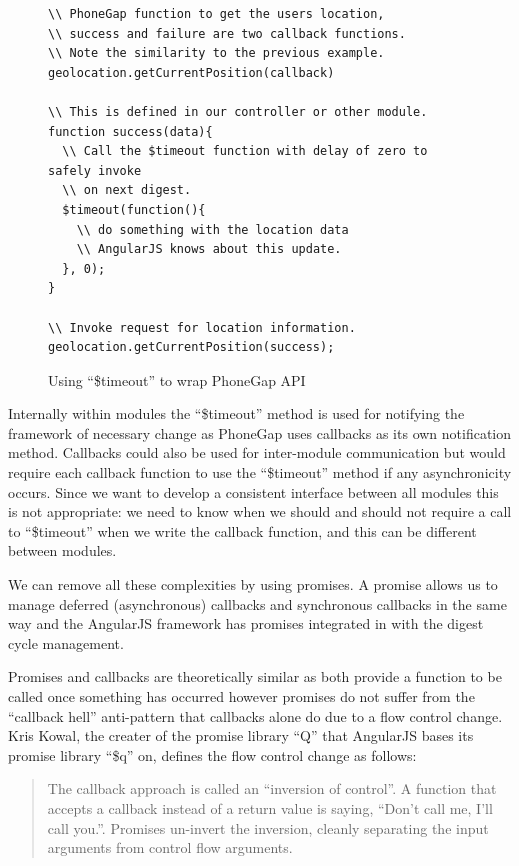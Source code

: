 \begin{figure}[h]
\begin{verbatim}
\\ PhoneGap function to get the users location,
\\ success and failure are two callback functions.
\\ Note the similarity to the previous example.
geolocation.getCurrentPosition(callback)

\\ This is defined in our controller or other module.
function success(data){
  \\ Call the $timeout function with delay of zero to safely invoke
  \\ on next digest.
  $timeout(function(){
    \\ do something with the location data
    \\ AngularJS knows about this update.
  }, 0);
}

\\ Invoke request for location information.
geolocation.getCurrentPosition(success);
\end{verbatim}
\caption{Using ``\$timeout'' to wrap PhoneGap API}
\label{fig:timeout}
\end{figure}

Internally within modules the ``\$timeout'' method is used for
notifying the framework of necessary change as PhoneGap uses callbacks
as its own notification method. Callbacks could also be used for
inter-module communication but would require each callback function to
use the ``\$timeout'' method if any asynchronicity occurs. Since we
want to develop a consistent interface between all modules this is not
appropriate: we need to know when we should and should not require a
call to ``\$timeout'' when we write the callback function, and this
can be different between modules.

We can remove all these complexities by using promises. A promise
allows us to manage deferred (asynchronous) callbacks and synchronous
callbacks in the same way and the AngularJS framework has promises
integrated in with the digest cycle management. 

Promises and callbacks are theoretically similar as both provide a
function to be called once something has occurred however promises do
not suffer from the ``callback hell'' anti-pattern that callbacks
alone do due to a flow control change.
Kris Kowal, the creater of the promise library ``Q'' that
AngularJS bases its promise library ``\$q'' on, defines the flow
control change as follows:
\begin{quote}
The callback approach is called an ``inversion of control''. A function
that accepts a callback instead of a return value is saying, ``Don’t
call me, I’ll call you.''. Promises un-invert the inversion, cleanly
separating the input arguments from control flow arguments.\cite{kriskowalq}
\end{quote}

